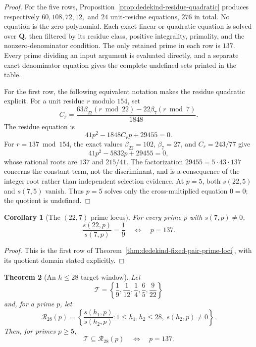 \documentclass[11pt]{article}
\newtheorem{theorem}{Theorem}[section]
\newtheorem{corollary}[theorem]{Corollary}
\theoremstyle{definition}
\theoremstyle{remark}
\newcommand{\Q}{\mathbf{Q}}
\begin{document}
\begin{proof}
For the five rows, Proposition~\ref{prop:dedekind-residue-quadratic} produces
respectively $60,108,72,12,$ and $24$ unit-residue equations, $276$ in total.
No equation is the zero polynomial.  Each exact linear or quadratic equation
is solved over $\Q$, then filtered by its residue class, positive integrality,
primality, and the nonzero-denominator condition.  The only retained prime in
each row is $137$.  Every prime dividing an input argument is evaluated
directly, and a separate exact denominator equation gives the complete
undefined sets printed in the table.

For the first row, the following equivalent notation makes the residue
quadratic explicit.  For a
unit residue $r$ modulo $154$, set
\[
  C_r=\frac{63\beta_{22}(r\bmod22)-22\beta_7(r\bmod7)}{1848}.
\]
The residue equation is
\begin{equation}\label{eq:dedekind-ratio-general}
  41p^2-1848C_rp+29455=0.
\end{equation}
For $r=137\bmod154$, the exact values
$\beta_{22}=102$, $\beta_7=27$, and $C_r=243/77$ give
\begin{equation}\label{eq:dedekind-ratio-137}
  41p^2-5832p+29455=0,
\end{equation}
whose rational roots are $137$ and $215/41$.  The factorization
$29455=5\cdot43\cdot137$ concerns the constant term, not the discriminant,
and is a consequence of the integer root rather than independent selection
evidence.  At $p=5$, both $s(22,5)$ and $s(7,5)$ vanish.  Thus $p=5$ solves
only the cross-multiplied equation $0=0$; the quotient is undefined.
\end{proof}

\begin{corollary}[The $(22,7)$ prime locus]
\label{cor:dedekind-ratio-prime-locus}
For every prime $p$ with $s(7,p)\neq0$,
\[
  \frac{s(22,p)}{s(7,p)}=\frac19
  \quad\Longleftrightarrow\quad p=137.
\]
\end{corollary}

\begin{proof}
This is the first row of
Theorem~\ref{thm:dedekind-fixed-pair-prime-loci}, with its quotient domain
stated explicitly.
\end{proof}

\begin{theorem}[An $h\leq28$ target window]
\label{thm:dedekind-h28-target-window}
Let
\[
  \mathcal T=\left\{\frac19,\frac1{12},\frac14,\frac65,\frac9{22}\right\}
\]
and, for a prime $p$, let
\[
  \mathcal R_{28}(p)=
  \left\{
    \frac{s(h_1,p)}{s(h_2,p)}:
    1\leq h_1,h_2\leq28,\ s(h_2,p)\neq0
  \right\}.
\]
Then, for primes $p\geq5$,
\[
  \mathcal T\subseteq\mathcal R_{28}(p)
  \quad\Longleftrightarrow\quad p=137.
\]
\end{theorem}
\end{document}
